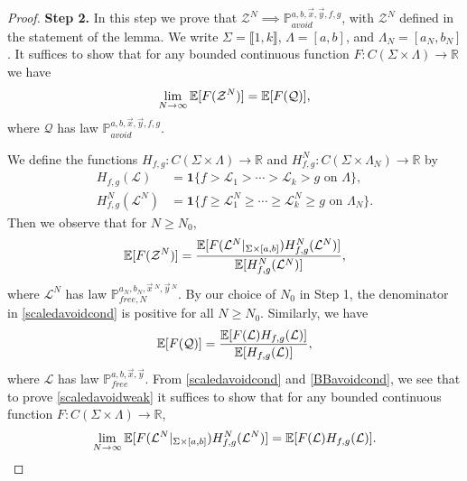 \begin{proof}
	\noindent\textbf{Step 2. } In this step we prove that $\mathcal{Z}^N \implies \mathbb{P}^{a,b,\vec{x},\vec{y},f,g}_{avoid}$, with $\mathcal{Z}^N$ defined in the statement of the lemma. We write $\Sigma = \llbracket 1,k\rrbracket$, $\Lambda = [a,b]$, and $\Lambda_N = [a_N,b_N]$. It suffices to show that for any bounded continuous function $F : C(\Sigma\times\Lambda)\to\mathbb{R}$ we have
	\begin{equation}\label{scaledavoidweak}
	\lim_{N\to\infty} \mathbb{E}[F(\mathcal{Z}^N)] = \mathbb{E}[F(\mathcal{Q})],
	\end{equation}
	where $\mathcal{Q}$ has law $\mathbb{P}^{a,b,\vec{x},\vec{y},f,g}_{avoid}$.
	
	We define the functions $H_{f,g} : C(\Sigma\times\Lambda)\to\mathbb{R}$ and $H^N_{f,g}:C(\Sigma\times\Lambda_N)\to\mathbb{R}$ by
	\begin{align*}
	H_{f,g}(\mathcal{L}) &= \mathbf{1}\{f > \mathcal{L}_1 > \cdots > \mathcal{L}_k > g \mbox{ on } \Lambda\},\\
	H^N_{f,g}(\mathcal{L}^N) &= \mathbf{1}\{f \geq \mathcal{L}^N_1 \geq \cdots \geq \mathcal{L}^N_k \geq g \mbox{ on } \Lambda_N\}.
	\end{align*}
	Then we observe that for $N\geq N_0$,
	\begin{equation}\label{scaledavoidcond}
	\mathbb{E}[F(\mathcal{Z}^N)] = \frac{\mathbb{E}[F(\mathcal{L}^N|_{\Sigma\times[a,b]})H_{f,g}^N(\mathcal{L}^N)]}{\mathbb{E}[H_{f,g}^N(\mathcal{L}^N)]},
	\end{equation}
	where $\mathcal{L}^N$ has law $\mathbb{P}^{a_N,b_N,\vec{x}\,^N,\vec{y}\,^N}_{free,N}$. By our choice of $N_0$ in Step 1, the denominator in \eqref{scaledavoidcond} is positive for all $N\geq N_0$. Similarly, we have
	\begin{equation}\label{BBavoidcond}
	\mathbb{E}[F(\mathcal{Q})] = \frac{\mathbb{E}[F(\mathcal{L})H_{f,g}(\mathcal{L})]}{\mathbb{E}[H_{f,g}(\mathcal{L})]}, 
	\end{equation}
	where $\mathcal{L}$ has law $\mathbb{P}^{a,b,\vec{x},\vec{y}}_{free}$. From \eqref{scaledavoidcond} and \eqref{BBavoidcond}, we see that to prove \eqref{scaledavoidweak} it suffices to show that for any bounded continuous function $F:C(\Sigma\times\Lambda)\to\mathbb{R}$,
	\begin{equation}\label{scaledBBex}
	\lim_{N\to\infty}\mathbb{E}[F(\mathcal{L}^N|_{\Sigma\times[a,b]})H_{f,g}^N(\mathcal{L}^N)] = \mathbb{E}[F(\mathcal{L})H_{f,g}(\mathcal{L})].
	\end{equation}

\end{proof}
